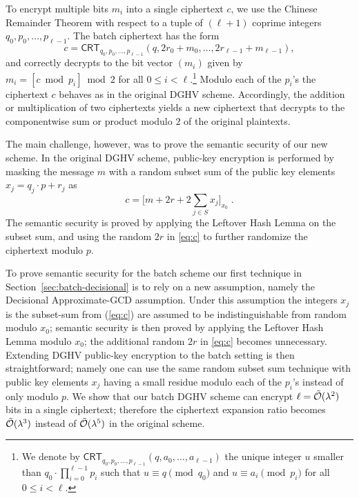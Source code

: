 \documentclass{llncs}
\renewcommand\leq\leqslant
\newcommand{\Ot}[1]{{\cal \tilde O}(#1)}
\newcommand*{\crt}{\ensuremath{\mathsf{CRT}}}
\begin{document}
To encrypt multiple bits $m_i$ into a single
ciphertext $c$, we use the Chinese Remainder
Theorem with respect to a tuple of $(\ell+1)$ coprime integers $q_0,p_0,\ldots,p_{\ell-1}$. The batch ciphertext has the form
\[ c = \crt_{q_0,p_0,\ldots,p_{\ell-1}}(q, 2r_0+m_0,\ldots,2r_{\ell-1}+m_{\ell-1}), \]
and correctly decrypts to the bit vector $(m_i)$ given by $m_i=[c \bmod p_i]\bmod 2$ for all $0 \leq i < \ell$.\footnote{We denote by 
$\crt_{q_0,p_0,\ldots,p_{\ell-1}}(q,a_0,\ldots,a_{\ell-1})$ the unique
  integer $u$ smaller than $q_0\cdot\prod_{i=0}^{\ell-1} p_i$ such
  that $u \equiv q \pmod{q_0}$ and $u \equiv a_i \pmod{p_i}$ for
  all $0 \leq i < \ell$.} Modulo each of the $p_i$'s the
ciphertext $c$ behaves as in the original DGHV scheme. Accordingly, the
addition or multiplication of two ciphertexts yields a new ciphertext
that decrypts to the componentwise sum or product modulo $2$ of the original
plaintexts.


The main challenge, however, was to prove the semantic security of our new scheme. In the original DGHV scheme, public-key encryption is
performed by masking the message $m$ with a random subset sum of the
public key elements $x_j=q_j \cdot p + r_j$ as
\begin{equation}
\label{eq:c}
c = \bigg[ m+2r+2 \sum\limits_{j \in S} x_j \bigg]_{x_0}\;.
\end{equation}
The semantic security is proved by applying the Leftover Hash Lemma on
the subset sum, and using the random $2r$ in \eqref{eq:c} to further
randomize the ciphertext modulo $p$.

To prove semantic security for the batch scheme our first technique in
Section~\ref{sec:batch-decisional} is
to rely on a new assumption, namely the Decisional Approximate-GCD 
assumption. Under this assumption the integers $x_j$ is the subset-sum
from (\ref{eq:c}) are assumed to be indistinguishable from random
modulo $x_0$; semantic security is then proved by applying the Leftover
Hash Lemma modulo $x_0$; the additional random $2r$ in \eqref{eq:c} becomes
unnecessary. Extending DGHV public-key
encryption to the batch setting is then straightforward; namely one can use
the same random subset sum technique with
public key elements $x_j$ having a small residue modulo each of the $p_i$'s
instead of only modulo $p$. We show that our batch DGHV scheme
can encrypt $\ell=\Ot{\lambda^2}$ bits in a single ciphertext; therefore
the ciphertext expansion ratio becomes $\Ot{\lambda^3}$ instead of
$\Ot{\lambda^5}$ in the original scheme.
\end{document}
